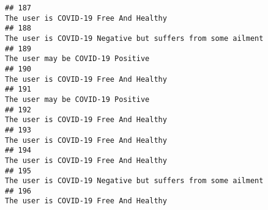 \documentclass[
]{article}
\begin{document}
\begin{verbatim}
## 187                                                                                                                                                                                                                              The user is COVID-19 Free And Healthy
## 188                                                                                                                                                                                                        The user is COVID-19 Negative but suffers from some ailment
## 189                                                                                                                                                                                                                                  The user may be COVID-19 Positive
## 190                                                                                                                                                                                                                              The user is COVID-19 Free And Healthy
## 191                                                                                                                                                                                                                                  The user may be COVID-19 Positive
## 192                                                                                                                                                                                                                              The user is COVID-19 Free And Healthy
## 193                                                                                                                                                                                                                              The user is COVID-19 Free And Healthy
## 194                                                                                                                                                                                                                              The user is COVID-19 Free And Healthy
## 195                                                                                                                                                                                                        The user is COVID-19 Negative but suffers from some ailment
## 196                                                                                                                                                                                                                              The user is COVID-19 Free And Healthy

\end{verbatim}
\end{document}
